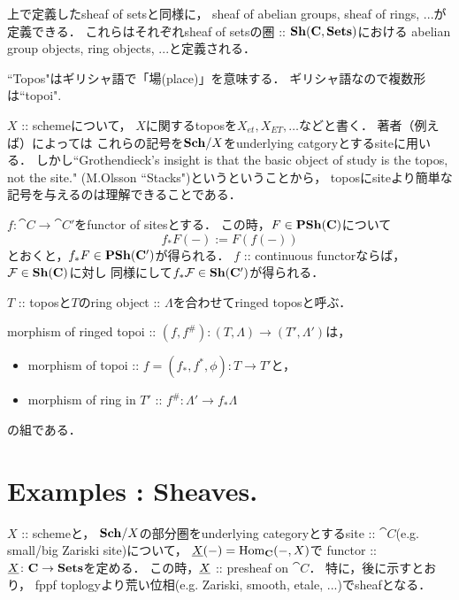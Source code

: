 \documentclass[a4paper]{jsarticle}
\begin{document}
\begin{Remark}
    上で定義したsheaf of setsと同様に，
    sheaf of abelian groups, sheaf of rings, ...が定義できる．
    これらはそれぞれsheaf of setsの圏 :: $\mathbf{Sh}(\mathbf{C}, \mathbf{Sets})$における
    abelian group objects, ring objects, ...と定義される．
\end{Remark}

\begin{Remark}
    ``Topos"はギリシャ語で「場(place)」を意味する．
    ギリシャ語なので複数形は``topoi".

    $X$ :: schemeについて，
    $X$に関するtoposを$X_{et}, X_{ET}, \dots$などと書く．
    著者（例えば\cite{StacksProj}）によっては
    これらの記号を$\mathbf{Sch}/X$をunderlying catgoryとするsiteに用いる．
    しかし``Grothendieck’s insight is that the basic object of study is the topos, not the site."
    (M.Olsson ``Stacks")というということから，
    toposにsiteより簡単な記号を与えるのは理解できることである．
\end{Remark}

\begin{Def}
    $f \colon \cat{C} \to \cat{C}'$をfunctor of sitesとする．
    この時，$F \in \mathbf{PSh}(\mathbf{C})$について
    \[ f_*F(-):=F(f(-)) \]
    とおくと，$f_* F \in \mathbf{PSh}(\mathbf{C}')$が得られる．
    $f$ :: continuous functorならば，
    $\mathcal{F} \in \mathbf{Sh}(\mathbf{C})$に対し
    同様にして$f_*\mathcal{F} \in \mathbf{Sh}(\mathbf{C}')$が得られる．
\end{Def}

\begin{Def}
\begin{myenum}{\roman*}
    \item
    $T$ :: toposと$T$のring object :: $\Lambda$を合わせてringed toposと呼ぶ．

    \item
    morphism of ringed topoi :: $(f, f^{\#}) \colon (T, \Lambda) \to (T', \Lambda')$は，
    \begin{itemize}
        \item morphism of topoi :: $f=(f_*, f^*, \phi) \colon T \to T'$と，
        \item morphism of ring in $T'$ :: $f^{\#} \colon \Lambda' \to f_* \Lambda$
    \end{itemize}
    の組である．
\end{myenum}
\end{Def}

\section{Examples : Sheaves.}
\begin{Example}
    $X$ :: schemeと，
    $\mathbf{Sch}/X$の部分圏をunderlying categoryとするsite :: $\cat{C}$(e.g. small/big Zariski site)について，
    $\underline{X}(-)=\operatorname{Hom}_{\mathbf{C}}(-, X)$で
    functor :: $\underline{X} \colon \mathbf{C} \to \mathbf{Sets}$を定める．
    この時，$\underline{X}$ :: presheaf on $\cat{C}$．
    特に，後に示すとおり，
    fppf toplogyより荒い位相(e.g. Zariski, smooth, etale, ...)でsheafとなる．
\end{Example}
\end{document}
